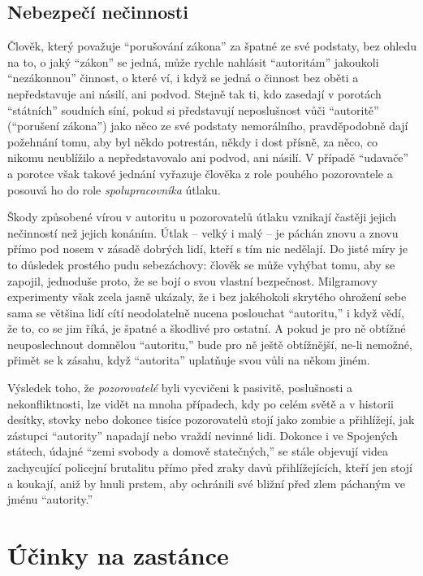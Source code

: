 \documentclass{book}
\begin{document}
\section{Nebezpečí nečinnosti}

Člověk, který považuje \enquote{porušování zákona} za špatné ze své podstaty, bez ohledu na to, o jaký \enquote{zákon} se jedná, může rychle nahlásit \enquote{autoritám} jakoukoli \enquote{nezákonnou} činnost, o které ví, i když se jedná o činnost bez oběti a nepředstavuje ani násilí, ani podvod. Stejně tak ti, kdo zasedají v porotách \enquote{státních} soudních síní, pokud si představují neposlušnost vůči \enquote{autoritě} (\enquote{porušení zákona}) jako něco ze své podstaty nemorálního, pravděpodobně dají požehnání tomu, aby byl někdo potrestán, někdy i dost přísně, za něco, co nikomu neublížilo a nepředstavovalo ani podvod, ani násilí. V případě \enquote{udavače} a porotce však takové jednání vyřazuje člověka z role pouhého pozorovatele a posouvá ho do role \emph{spolupracovníka} útlaku.

Škody způsobené vírou v autoritu u pozorovatelů útlaku vznikají častěji jejich nečinností než jejich konáním. Útlak -- velký i malý -- je páchán znovu a znovu přímo pod nosem v zásadě dobrých lidí, kteří s tím nic nedělají. Do jisté míry je to důsledek prostého pudu sebezáchovy: člověk se může vyhýbat tomu, aby se zapojil, jednoduše proto, že se bojí o svou vlastní bezpečnost. Milgramovy experimenty však zcela jasně ukázaly, že i bez jakéhokoli skrytého ohrožení sebe sama se většina lidí cítí neodolatelně nucena poslouchat \enquote{autoritu,} i když vědí, že to, co se jim říká, je špatné a škodlivé pro ostatní. A pokud je pro ně obtížné neuposlechnout domnělou \enquote{autoritu,} bude pro ně ještě obtížnější, ne-li nemožné, přimět se k zásahu, když \enquote{autorita} uplatňuje svou vůli na někom jiném.

Výsledek toho, že \emph{pozorovatelé} byli vycvičeni k pasivitě, poslušnosti a nekonfliktnosti, lze vidět na mnoha případech, kdy po celém světě a v historii desítky, stovky nebo dokonce tisíce pozorovatelů stojí jako zombie a přihlížejí, jak zástupci \enquote{autority} napadají nebo vraždí nevinné lidi. Dokonce i ve Spojených státech, údajné \enquote{zemi svobody a domově statečných,} se stále objevují videa zachycující policejní brutalitu přímo před zraky davů přihlížejících, kteří jen stojí a koukají, aniž by hnuli prstem, aby ochránili své bližní před zlem páchaným ve jménu \enquote{autority.}

\chapter{Účinky na zastánce}
\end{document}
